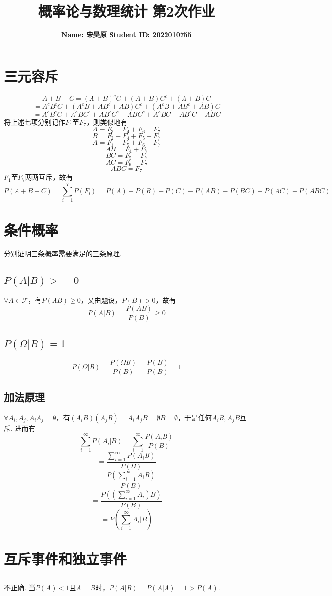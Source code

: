 \documentclass{article}
\title{\bf\Large  概率论与数理统计 第2次作业}
\author{\bf Name: 宋昊原 \qquad Student ID: 2022010755}
\begin{document}
\begin{CJK}{UTF8}{gbsn}
\maketitle
\section{三元容斥}
$$ A+B+C=(A+B)^{c}C+(A+B)C^{c}+(A+B)C $$
$$ =A^{c}B^{c}C+(A^{c}B+AB^{c}+AB)C^{c}+(A^{c}B+AB^{c}+AB)C $$
$$ =A^{c}B^{c}C+A^{c}BC^{c}+AB^{c}C^{c}+ABC^{c}+A^{c}BC+AB^{c}C+ABC $$
将上述七项分别记作$F_{1}$至$F_{7}$，则类似地有
$$ A=F_{3}+F_{4}+F_{6}+F_{7} $$
$$ B=F_{2}+F_{4}+F_{5}+F_{7} $$
$$ A=F_{1}+F_{5}+F_{6}+F_{7} $$
$$ AB=F_{4}+F_{7} $$
$$ BC=F_{5}+F_{7} $$
$$ AC=F_{6}+F_{7} $$
$$ ABC=F_{7} $$
$F_{1}$至$F_{7}$两两互斥，故有
$$ P(A+B+C)=\sum\limits_{i=1}^{7} P(F_{i})=P(A)+P(B)+P(C)-P(AB)-P(BC)-P(AC)+P(ABC) $$
\section{条件概率}
分别证明三条概率需要满足的三条原理.
\subsection{$P(A|B)>=0$}
$\forall A\in \mathcal{F}$，有$P(AB)\geq 0$，又由题设，$P(B)>0$，故有
$$ P(A|B)=\frac{P(AB)}{P(B)}\geq 0$$
\subsection{$P(\Omega|B)=1$}
$$ P(\Omega|B)=\frac{P(\Omega B)}{P(B)}=\frac{P(B)}{P(B)}=1 $$
\subsection{加法原理}
$\forall A_{i},A_{j},A_{i}A_{j}=\emptyset $，有$(A_{i}B)(A_{j}B)=A_{i}A_{j}B=\emptyset B=\emptyset $，于是任何$A_{i}B,A_{j}B$互斥. 进而有
$$ \sum\limits_{i=1}^{\infty} P(A_{i}|B)=\sum\limits_{i=1}^{\infty} \frac{P(A_{i}B)}{P(B)} $$
$$ =\frac{\sum\limits_{i=1}^{\infty} P(A_{i}B)}{P(B)} $$
$$ =\frac{P(\sum\limits_{i=1}^{\infty} A_{i}B)}{P(B)} $$
$$ =\frac{P((\sum\limits_{i=1}^{\infty} A_{i})B)}{P(B)} $$
$$ =P(\sum\limits_{i=1}^{\infty} A_{i}|B) $$
\section{互斥事件和独立事件}
\subsection{}
不正确. 当$P(A)<1$且$A=B$时，$P(A|B)=P(A|A)=1>P(A)$.

\end{CJK}
\end{document}
